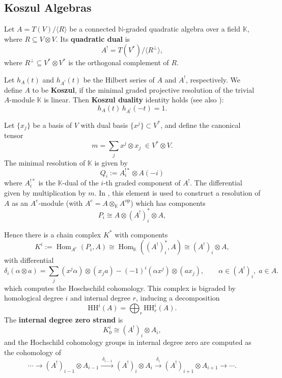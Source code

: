 \documentclass{amsart}
\DeclareMathOperator{\Hom}{Hom}
\begin{document}
\subsection{Koszul Algebras}  
Let \( A = T(V)/\langle R \rangle \) be a connected \(\mathbb{N}\)-graded quadratic algebra over a field \( \mathbb{K} \), where \( R \subseteq V \otimes V \). Its \textbf{quadratic dual} is
\[
A^! = T(V^*) / \langle R^\perp \rangle,
\]
where \( R^\perp \subseteq V^* \otimes V^* \) is the orthogonal complement of \( R \).

Let \( h_A(t) \) and \( h_{A^!}(t) \) be the Hilbert series of \( A \) and \( A^! \), respectively.
We define  \( A \) to be \textbf{Koszul}, if the minimal graded projective resolution of the trivial \( A \)-module \( \mathbb{K} \) is linear.   Then \textbf{Koszul duality} identity holds \cite{Positselskii1995} (see also \cite[Thm.~5.9]{MR1388568}):
\[
h_A(t)\, h_{A^!}(-t) = 1.
\]

Let \(\{x_j\}\) be a basis of \(V\) with dual basis \(\{x^j\}\subset V^*\), and define the canonical tensor
\[
m = \sum_j x^j \otimes x_j \;\in V^*\otimes V.
\]
The minimal resolution of $\mathbb{K}$ is given by 
$$Q_i:=A_i^{!*}\otimes A(-i)$$ 
where \(A^{!*}_i\) is the \( \mathbb{K} \)-dual of the \( i \)-th graded component of \( A^! \).  
The differential given by multiplication by $m$.
In \cite[Prop.~3.1]{vandenBergh1994}, this element is used to construct  a resolution of \( A \) as an \( A^e \)-module (with \( A^e = A \otimes_\mathbb{K} A^{\mathrm{op}} \)) which has components
\[
P_i \cong A \otimes (A^!)_i^* \otimes A,
\]

Hence there is a chain complex $K^*$ with components
\[
K^i := \Hom_{A^e}(P_i, A) \cong \Hom_{\mathbb{K}}((A^!)_i^*, A) \cong (A^!)_i \otimes A,
\]
with differential 
\[
\delta_i(\alpha \otimes a) = \sum_j (x^j \alpha) \otimes (x_j a) - (-1)^i (\alpha x^j) \otimes (a x_j),
\qquad \alpha\in (A^!)_i,\; a\in A.
\]
which computes the Hoschschild cohomology.
This complex is bigraded by homological degree \( i \) and internal degree \( r \), inducing a decomposition
\[
\mathrm{HH}^i(A) = \bigoplus_r \mathrm{HH}^i_r(A).
\]
The \textbf{internal degree zero strand} is
\[
K^i_0 \cong (A^!)_i \otimes A_i,
\]
and the Hochschild cohomology groups in internal degree zero are computed as the cohomology of
\[
\cdots \to (A^!)_{i-1}\otimes A_{i-1} \xrightarrow{\;\delta_{i-1}\;} (A^!)_i\otimes A_i \xrightarrow{\;\delta_i\;} (A^!)_{i+1}\otimes A_{i+1}\to \cdots.
\]
\end{document}
